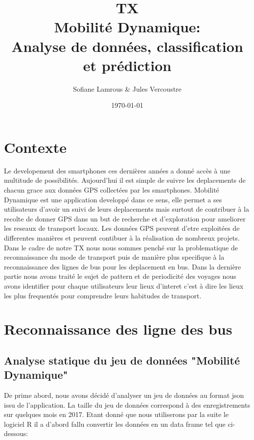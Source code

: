 \documentclass{article}
\title{\vspace*{\fill}\textbf{TX\\Mobilité Dynamique:} \\ Analyse de données, classification et prédiction \vspace*{\fill}}
\author{Sofiane Lamrous \& Jules Vercoustre}
\date{\today}
\begin{document}
\maketitle %
\thispagestyle{fancy}

\newpage
\vspace*{\fill}
\section*{Contexte}

Le developement des smartphones ces dernières années a donné accès à une multitude de possibilités. Aujourd'hui il est simple de suivre les deplacements de chacun grace aux données GPS collectées par les smartphones. Mobilité Dynamique est une application developpé dans ce sens, elle permet a ses utilisateurs d'avoir un suivi de leurs deplacements mais surtout de contribuer à la recolte de donner GPS dans un but de recherche et d'exploration pour ameliorer les reseaux de transport locaux.
Les données GPS peuvent d'etre exploitées de differentes manières et peuvent contibuer à la réalisation de nombreux projets. Dans le cadre de notre TX nous nous sommes penché sur la problematique de reconnaissance du mode de transport puis de manière plus specifique à la reconnaissance des lignes de bus pour les deplacement en bus. Dans la dernière partie nous avons traité le sujet de pattern et de periodicité des voyages nous avons identifier pour chaque utilisateurs leur lieux d'interet c'est à dire les lieux les plus frequentés pour comprendre leurs habitudes de transport.


\vspace*{\fill}


\newpage




\tableofcontents


\newpage

\section{Reconnaissance des ligne des bus}

\subsection{Analyse statique du jeu de données "Mobilité Dynamique"}

De prime abord, nous avons décidé d'analyser un jeu de données au format json issu de l'application. La taille du jeu de données correspond à des enregistrements sur quelques mois en 2017. Etant donné que nous utiliserons par la suite le logiciel R il a d'abord fallu convertir les données en un data frame tel que ci-dessous:
\end{document}

